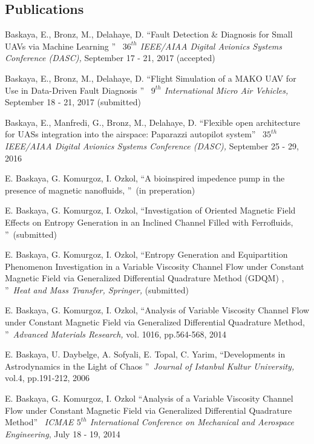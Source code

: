 \documentclass[margin,line]{res}
\begin{document}
\begin{resume}
\section{\sc Publications}

Baskaya, E., Bronz, M., Delahaye, D. \textquotedblleft Fault Detection \& Diagnosis for Small UAVs via Machine Learning \textquotedblright\  \emph{ $36^{th}$ IEEE/AIAA Digital Avionics Systems Conference (DASC),} September 17 - 21, 2017 (accepted)

Baskaya, E., Bronz, M., Delahaye, D. \textquotedblleft Flight Simulation of a MAKO UAV for Use in Data-Driven Fault Diagnosis \textquotedblright\  \emph{  $9^{th}$ International Micro Air Vehicles,} September 18 - 21, 2017 (submitted)

Baskaya, E., Manfredi, G., Bronz, M., Delahaye, D. \textquotedblleft Flexible open architecture for UASs integration into the airspace: Paparazzi autopilot system\textquotedblright\  \emph{ $35^{th}$ IEEE/AIAA Digital Avionics Systems Conference (DASC),} September 25 - 29, 2016

E. Baskaya, G. Komurgoz, I. Ozkol, \textquotedblleft A bioinspired impedence pump in the presence of magnetic nanofluids, \textquotedblright\ (in preperation)

E. Baskaya, G. Komurgoz, I. Ozkol, \textquotedblleft Investigation of Oriented Magnetic Field Effects on Entropy Generation in an Inclined Channel Filled with Ferrofluids, \textquotedblright\ (submitted)

E. Baskaya, G. Komurgoz, I. Ozkol, \textquotedblleft Entropy Generation and Equipartition Phenomenon Investigation in a Variable Viscosity Channel Flow under Constant Magnetic Field via Generalized Differential Quadrature Method (GDQM) , \textquotedblright\ \emph{Heat and Mass Transfer, Springer,} (submitted)

E. Baskaya, G. Komurgoz, I. Ozkol, \textquotedblleft Analysis of Variable Viscosity Channel Flow under Constant Magnetic Field via Generalized Differential Quadrature Method, \textquotedblright\ \emph{Advanced Materials Research,} vol. 1016, pp.564-568, 2014

E. Baskaya, U. Daybelge, A. Sofyali, E. Topal, C. Yarim, \textquotedblleft Developments in Astrodynamics in the Light of Chaos \textquotedblright\ \emph{Journal of Istanbul Kultur University,} vol.4, pp.191-212, 2006

E. Baskaya, G. Komurgoz, I. Ozkol \textquotedblleft Analysis of a Variable Viscosity Channel Flow under Constant Magnetic Field via Generalized Differential Quadrature Method\textquotedblright\ \emph{ ICMAE $5^{th}$ International Conference on Mechanical and Aerospace Engineering}, July 18 - 19, 2014 


\end{resume}
\end{document}
